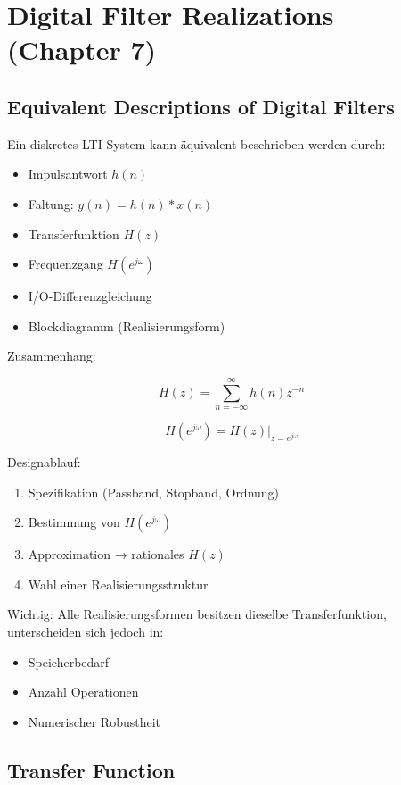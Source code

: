\section{Digital Filter Realizations (Chapter 7)}

\subsection{Equivalent Descriptions of Digital Filters}

Ein diskretes LTI-System kann äquivalent beschrieben werden durch:

\begin{itemize}
\item Impulsantwort $h(n)$
\item Faltung: $y(n)=h(n)*x(n)$
\item Transferfunktion $H(z)$
\item Frequenzgang $H(e^{j\omega})$
\item I/O-Differenzgleichung
\item Blockdiagramm (Realisierungsform)
\end{itemize}

Zusammenhang:

\[
H(z)=\sum_{n=-\infty}^{\infty} h(n)z^{-n}
\]

\[
H(e^{j\omega}) = H(z)\big|_{z=e^{j\omega}}
\]

Designablauf:

\begin{enumerate}
\item Spezifikation (Passband, Stopband, Ordnung)
\item Bestimmung von $H(e^{j\omega})$
\item Approximation → rationales $H(z)$
\item Wahl einer Realisierungsstruktur
\end{enumerate}

Wichtig:  
Alle Realisierungsformen besitzen dieselbe Transferfunktion, unterscheiden sich jedoch in:
\begin{itemize}
\item Speicherbedarf
\item Anzahl Operationen
\item Numerischer Robustheit
\end{itemize}

\subsection{Transfer Function}


